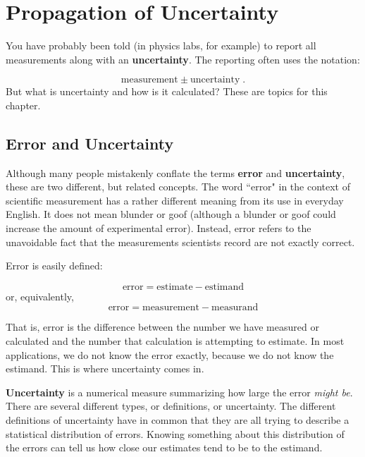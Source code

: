 \documentclass[twoside]{book}\usepackage[]{graphicx}\usepackage[]{xcolor}
\def\myindex#1{\index{#1}}
\def\term#1{\textbf{#1}}
\newlength{\tempfmlength}
\newenvironment{fmpage}[1]
     {
	 \medskip
	 \setlength{\tempfmlength}{#1}
	 \begin{lrbox}{\fmbox}
	   \begin{minipage}{#1}
		 \vspace*{.02\tempfmlength}
		 \hfill
	   \begin{minipage}{.95 \tempfmlength}}
		 {\end{minipage}\hfill
		 \vspace*{.015\tempfmlength}
		 \end{minipage}\end{lrbox}\fbox{\usebox{\fmbox}}
	 \medskip
	 }
\newenvironment{boxedText}[1][.98\textwidth]%
{%
\begin{center}
\begin{fmpage}{#1}
}%
{%
\end{fmpage}
\end{center}
}
\newcounter{example}[section]
\begin{document}
\setcounter{chapter}{5}

\chapter{Propagation of Uncertainty}
\label{chap:propagation}%

\myindex{uncertainty|defidx}
You have probably been told (in physics labs, for example) to report all measurements
along with an \term{uncertainty}.  The reporting often uses the notation:

\[ \mbox{measurement} \pm \mbox{uncertainty} \;. \]
%
But what is uncertainty and how is it calculated?  These are topics for this chapter.

\section{Error and Uncertainty}
Although many people mistakenly conflate the terms \term{error} and \term{uncertainty}, 
these are two different, but related concepts.  
The word ``error" in the context of scientific measurement has a rather
different meaning from its use in everyday English. It does not mean blunder or
goof (although a blunder or goof could increase the amount of experimental error). 
Instead, error refers to the unavoidable fact that
the measurements scientists record are not exactly correct.


Error is easily defined:

\begin{boxedText}
	\[ \mbox{error} = \mbox{estimate} - \mbox{estimand} \]
or, equivalently,
	\[ \mbox{error} = \mbox{measurement} - \mbox{measurand} \]
\end{boxedText}
That is, error is the difference between the number we have measured or calculated and the 
number that calculation is attempting to estimate.  In most applications, we do not know 
the error exactly, because we do not know the estimand.  This is where uncertainty comes in.

\term{Uncertainty} is a numerical measure summarizing how large the error \emph{might be}.  There are several different types, or definitions, or uncertainty.  The different definitions of uncertainty have in common that they are all trying to describe a statistical distribution of errors.  
Knowing something about this distribution
of the errors can tell us how close our estimates tend to be to the estimand.
\end{document}
